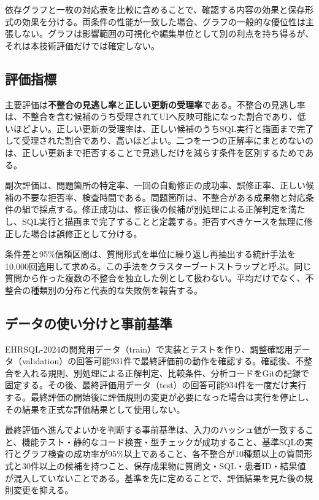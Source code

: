 \documentclass[a4paper]{jsarticle}
\newcommand{\term}[1]{\textbf{#1}}
\begin{document}
依存グラフと一枚の対応表を比較に含めることで、確認する内容の効果と保存形式の効果を分ける。両条件の性能が一致した場合、グラフの一般的な優位性は主張しない。グラフは影響範囲の可視化や編集単位として別の利点を持ち得るが、それは本技術評価だけでは確定しない。

\subsection{評価指標}

主要評価は\term{不整合の見逃し率}と\term{正しい更新の受理率}である。不整合の見逃し率は、不整合を含む候補のうち受理されてUIへ反映可能になった割合であり、低いほどよい。正しい更新の受理率は、正しい候補のうちSQL実行と描画まで完了して受理された割合であり、高いほどよい。二つを一つの正解率にまとめないのは、正しい更新まで拒否することで見逃しだけを減らす条件を区別するためである。

副次評価は、問題箇所の特定率、一回の自動修正の成功率、誤修正率、正しい候補の不要な拒否率、検査時間である。問題箇所は、不整合がある成果物と対応条件の組で採点する。修正成功は、修正後の候補が別処理による正解判定を満たし、SQL実行と描画まで完了することと定義する。拒否すべきケースを無理に修正した場合は誤修正として分ける。

条件差と95\%信頼区間は、質問形式を単位に繰り返し再抽出する統計手法を10,000回適用して求める。この手法をクラスターブートストラップと呼ぶ。同じ質問から作った複数の不整合を独立した例として扱わない。平均だけでなく、不整合の種類別の分布と代表的な失敗例を報告する。

\subsection{データの使い分けと事前基準}

EHRSQL-2024の開発用データ（train）で実装とテストを作り、調整確認用データ（validation）の回答可能931件で最終評価前の動作を確認する。確認後、不整合を入れる規則、別処理による正解判定、比較条件、分析コードをGitの記録で固定する。その後、最終評価用データ（test）の回答可能934件を一度だけ実行する。最終評価の開始後に評価規則の変更が必要になった場合は実行を停止し、その結果を正式な評価結果として使用しない。

最終評価へ進んでよいかを判断する事前基準は、入力のハッシュ値が一致すること、機能テスト・静的なコード検査・型チェックが成功すること、基準SQLの実行とグラフ検査の成功率が95\%以上であること、各不整合が10種類以上の質問形式と30件以上の候補を持つこと、保存成果物に質問文・SQL・患者ID・結果値が混入していないことである。基準を先に定めることで、評価結果を見た後の規則変更を抑える。
\end{document}
